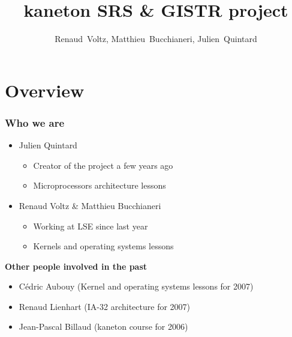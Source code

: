 
%
%



%
%

\title{kaneton SRS \& GISTR project}

%
%

\author
{
  Renaud~Voltz,
  Matthieu~Bucchianeri,
  Julien~Quintard
}

%
%



%
%

\begin{frame}
  \titlepage

  \begin{center}
    \logos
  \end{center}
\end{frame}

%
%

\section{Overview}


\begin{frame}
  \frametitle{Who we are}

  \begin{itemize}
    \item
      Julien Quintard
      \begin{itemize}
	\item
	Creator of the project a few years ago
        \item
	Microprocessors architecture lessons
      \end{itemize}
    \item
      Renaud Voltz \& Matthieu Bucchianeri
      \begin{itemize}
	\item
	Working at LSE since last year
	\item
	Kernels and operating systems lessons
      \end{itemize}
  \end{itemize}

  \nl

  \textbf{Other people involved in the past}

  \begin{itemize}
    \item
      C\'{e}dric Aubouy (Kernel and operating systems lessons for 2007)
    \item
      Renaud Lienhart (IA-32 architecture for 2007)
    \item
      Jean-Pascal Billaud (kaneton course for 2006)
  \end{itemize}

\end{frame}

